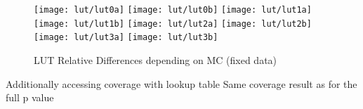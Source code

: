\begin{figure}
    \centering
    \texttt{[image: lut/lut0a]}
    \texttt{[image: lut/lut0b]}
    \texttt{[image: lut/lut1a]}
    \texttt{[image: lut/lut1b]}
     \texttt{[image: lut/lut2a]}
    \texttt{[image: lut/lut2b]}
    \texttt{[image: lut/lut3a]}  
    \texttt{[image: lut/lut3b]}
    \caption{LUT Relative Differences depending on MC (fixed data)}
    \label{fig:lut_reldiff_mc}
\end{figure}

Additionally accessing coverage with lookup table
Same coverage result as for the full p value


